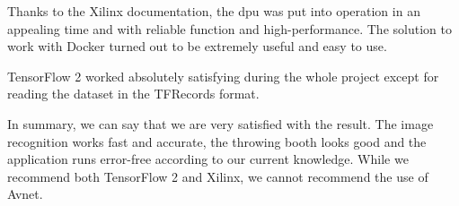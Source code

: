 Thanks to the Xilinx documentation, the \acrshort{dpu} was put into operation in an appealing time and with reliable function and high-performance.
The solution to work with Docker turned out to be extremely useful and easy to use.

TensorFlow 2 worked absolutely satisfying during the whole project except for reading the dataset in the TFRecords format.

In summary, we can say that we are very satisfied with the result.
The image recognition works fast and accurate, the throwing booth looks good and the application runs error-free according to our current knowledge.
While we recommend both TensorFlow 2 and Xilinx, we cannot recommend the use of Avnet.
